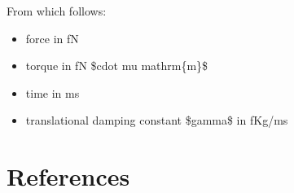 \documentclass[letterpaper,10pt,english]{sphinxmanual}
\begin{document}
\sphinxAtStartPar
From which follows:
\begin{itemize}
\item {} 
\sphinxAtStartPar
force in fN

\item {} 
\sphinxAtStartPar
torque in fN \$cdot mu mathrm\{m\}\$

\item {} 
\sphinxAtStartPar
time in ms

\item {} 
\sphinxAtStartPar
translational damping constant \$gamma\$ in fKg/ms

\end{itemize}


\chapter{References}
\end{document}

